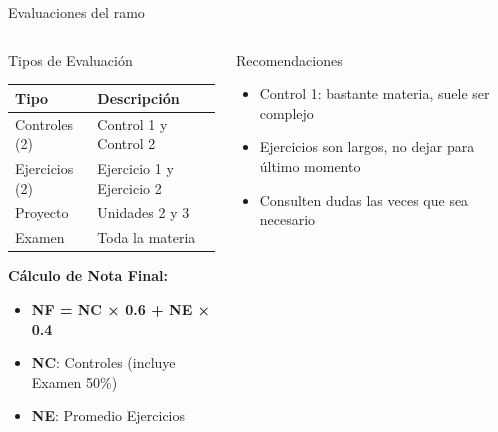 \documentclass[
    10pt,
    aspectratio=169,
    xcolor={dvipsnames},
    spanish,
    ]{beamer}
\begin{document}
\begin{frame}{Evaluaciones del ramo}
\begin{columns}
  \begin{column}{0.55\textwidth}
    \begin{block}{Tipos de Evaluación}
      \begin{table}[h]
        \centering
        \footnotesize
        \begin{tabular}{|l|l|}
        \hline
        \textbf{Tipo} & \textbf{Descripción} \\
        \hline
        Controles (2) & Control 1 y Control 2 \\
        \hline
        Ejercicios (2) & Ejercicio 1 y Ejercicio 2 \\
        \hline
        Proyecto & Unidades 2 y 3 \\
        \hline
        Examen & Toda la materia \\
        \hline
        \end{tabular}
      \end{table}
      
      \vspace{0.2cm}
      \textbf{Cálculo de Nota Final:}
      \begin{itemize}
        \item \textbf{NF = NC × 0.6 + NE × 0.4}
        \item \textbf{NC}: Controles (incluye Examen 50\%)
        \item \textbf{NE}: Promedio Ejercicios
      \end{itemize}
    \end{block}
  \end{column}
  
  \begin{column}{0.43\textwidth}
    \begin{alertblock}{Recomendaciones}
      \scriptsize
      \begin{itemize}
        \item Control 1: bastante materia, suele ser complejo
        \item Ejercicios son largos, no dejar para último momento
        \item Consulten dudas las veces que sea necesario
      \end{itemize}
    \end{alertblock}
  \end{column}
\end{columns}
\end{frame}
\end{document}

